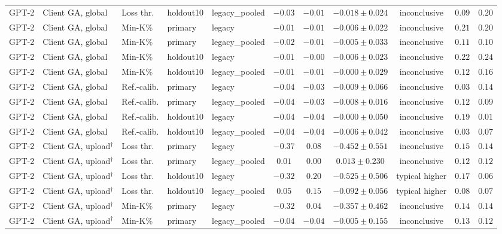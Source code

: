 {\begin{longtable}{@{\extracolsep{\fill}}lllllcccccc@{}}
GPT-2 & Client GA, global & Loss thr. & holdout10 & legacy\_pooled & $-0.03$ & $-0.01$ & $-0.018 \pm 0.024$ & inconclusive & $0.09$ & $0.20$ \\
GPT-2 & Client GA, global & Min-K\% & primary & legacy & $-0.01$ & $-0.01$ & $-0.006 \pm 0.022$ & inconclusive & $0.21$ & $0.20$ \\
GPT-2 & Client GA, global & Min-K\% & primary & legacy\_pooled & $-0.02$ & $-0.01$ & $-0.005 \pm 0.033$ & inconclusive & $0.11$ & $0.10$ \\
GPT-2 & Client GA, global & Min-K\% & holdout10 & legacy & $-0.01$ & $-0.00$ & $-0.006 \pm 0.023$ & inconclusive & $0.22$ & $0.24$ \\
GPT-2 & Client GA, global & Min-K\% & holdout10 & legacy\_pooled & $-0.01$ & $-0.01$ & $-0.000 \pm 0.029$ & inconclusive & $0.12$ & $0.16$ \\
GPT-2 & Client GA, global & Ref.-calib. & primary & legacy & $-0.04$ & $-0.03$ & $-0.009 \pm 0.066$ & inconclusive & $0.03$ & $0.14$ \\
GPT-2 & Client GA, global & Ref.-calib. & primary & legacy\_pooled & $-0.04$ & $-0.03$ & $-0.008 \pm 0.016$ & inconclusive & $0.12$ & $0.09$ \\
GPT-2 & Client GA, global & Ref.-calib. & holdout10 & legacy & $-0.04$ & $-0.04$ & $-0.000 \pm 0.050$ & inconclusive & $0.19$ & $0.01$ \\
GPT-2 & Client GA, global & Ref.-calib. & holdout10 & legacy\_pooled & $-0.04$ & $-0.04$ & $-0.006 \pm 0.042$ & inconclusive & $0.03$ & $0.07$ \\
GPT-2 & Client GA, upload$^{\dagger}$ & Loss thr. & primary & legacy & $-0.37$ & $0.08$ & $-0.452 \pm 0.551$ & inconclusive & $0.15$ & $0.14$ \\
GPT-2 & Client GA, upload$^{\dagger}$ & Loss thr. & primary & legacy\_pooled & $0.01$ & $0.00$ & $0.013 \pm 0.230$ & inconclusive & $0.12$ & $0.12$ \\
GPT-2 & Client GA, upload$^{\dagger}$ & Loss thr. & holdout10 & legacy & $-0.32$ & $0.20$ & $-0.525 \pm 0.506$ & typical higher & $0.17$ & $0.06$ \\
GPT-2 & Client GA, upload$^{\dagger}$ & Loss thr. & holdout10 & legacy\_pooled & $0.05$ & $0.15$ & $-0.092 \pm 0.056$ & typical higher & $0.08$ & $0.07$ \\
GPT-2 & Client GA, upload$^{\dagger}$ & Min-K\% & primary & legacy & $-0.32$ & $0.04$ & $-0.357 \pm 0.462$ & inconclusive & $0.14$ & $0.14$ \\
GPT-2 & Client GA, upload$^{\dagger}$ & Min-K\% & primary & legacy\_pooled & $-0.04$ & $-0.04$ & $-0.005 \pm 0.155$ & inconclusive & $0.13$ & $0.12$ \\

\end{longtable}}
